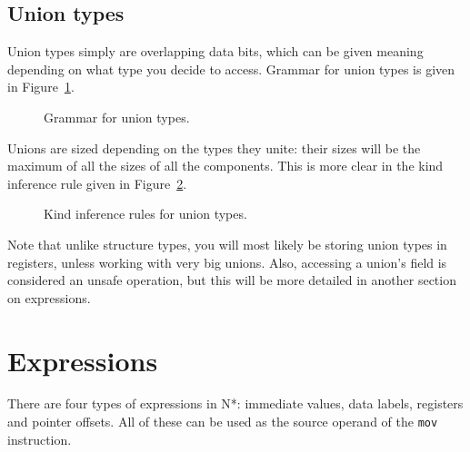 \subsection{Union types}\label{subsec:nstar-common-ts-unions}

Union types simply are overlapping data bits, which can be given meaning depending on what type you decide to access.
Grammar for union types is given in Figure~\ref{fig:nstar-common-ts-unions-syntax}.

\begin{figure}[htb]
  \centering

  \caption{Grammar for union types.}
  \label{fig:nstar-common-ts-unions-syntax}
\end{figure}

Unions are sized depending on the types they unite: their sizes will be the maximum of all the sizes of all the components.
This is more clear in the kind inference rule given in Figure~\ref{fig:nstar-common-ts-unions-kindrules}.

\begin{figure}[H]
  \centering

  \begin{prooftree}
  \end{prooftree}

  \caption{Kind inference rules for union types.}
  \label{fig:nstar-common-ts-unions-kindrules}
\end{figure}

Note that unlike structure types, you will most likely be storing union types in registers, unless working with very big unions.
Also, accessing a union's field is considered an unsafe operation, but this will be more detailed in another section on expressions.

\section{Expressions}\label{sec:nstar-common-expressions}

There are four types of expressions in N*: immediate values, data labels, registers and pointer offsets.
All of these can be used as the source operand of the \texttt{mov} instruction.

